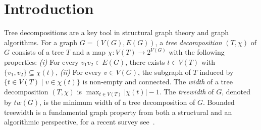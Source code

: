\documentclass[11pt]{amsart}
\newcommand{\cal}{\mathcal}
\newcommand{\tw}{tw\xspace}
\newcommand{\w}{\omega\xspace}
\newcommand{\atw}{tw_{\alpha}\xspace}
\begin{document}


\maketitle


\newpage
{}

\section{Introduction}\label{sec:intro}


Tree decompositions are a key tool in structural graph theory and graph algorithms. For a graph $G = (V(G),E(G))$, a \emph{tree decomposition} $(T, \chi)$ of $G$ consists of a tree $T$ and a map $\chi: V(T) \to 2^{V(G)}$ with the following properties: {\em (i)} For every $v_1v_2 \in E(G)$, there exists $t \in V(T)$ with $\{v_1, v_2\} \subseteq \chi(t)$, {\em (ii)} For every $v \in V(G)$, the subgraph of $T$ induced by $\{t \in V(T) \mid v \in \chi(t)\}$ is non-empty and connected.
%
The \emph{width} of a tree decomposition $(T, \chi)$
is $\max_{t \in V(T)} |\chi(t)|-1$. The \emph{treewidth} of $G$, denoted by $\tw(G)$, is the minimum width of a tree decomposition of $G$. Bounded treewidth is a fundamental graph property from both a structural \cite{bodlaender1998partial,RS-GMXVI} and an algorithmic \cite{cygan2015parameterized} perspective, for a recent survey see~\cite{korhonen2024computing}. 
\end{document}
